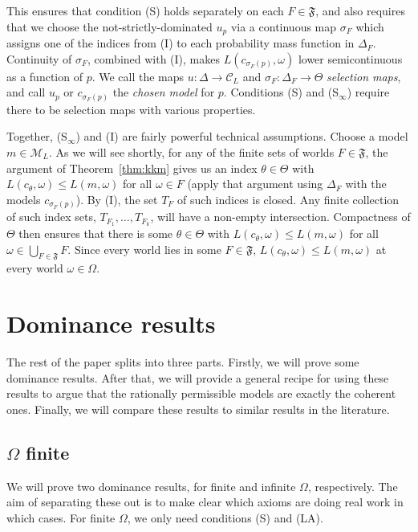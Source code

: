 \documentclass[11pt]{article}
\theoremstyle{definition}
\theoremstyle{remark}
\newcommand{\M}{\mathcal M}
\newcommand{\C}{\mathcal C}
\newcommand{\F}{\mathfrak F}
\begin{document}
This ensures that condition (S) holds separately on each $F\in\F$, and also requires that we choose the not-strictly-dominated $u_p$ via a continuous map $\sigma_F$ which assigns one of the indices from (I) to each probability mass function in $\Delta_F$. Continuity of $\sigma_F$, combined with (I), makes $L(c_{\sigma_F(p)},\omega)$ lower semicontinuous as a function of $p$. We call the maps $u:\Delta\to\C_L$ and $\sigma_F:\Delta_F\to\Theta$ \emph{selection maps}, and call $u_p$ or $c_{\sigma_F(p)}$ the \emph{chosen model} for $p$. Conditions (S) and (S$_\infty$) require there to be selection maps with various properties.

Together, (S$_\infty$) and (I) are fairly powerful technical assumptions. Choose a model $m\in\M_L$. As we will see shortly, for any of the finite sets of worlds $F\in\F$, the argument of Theorem~\ref{thm:kkm} gives us an index $\theta\in\Theta$ with $L(c_\theta,\omega)\le L(m,\omega)$ for all $\omega\in F$ (apply that argument using $\Delta_F$ with the models $c_{\sigma_F(p)}$). By (I), the set $T_F$ of such indices is closed. Any finite collection of such index sets, $T_{F_1},\dots, T_{F_k}$, will have a non-empty intersection. Compactness of $\Theta$ then ensures that there is some $\theta\in\Theta$ with $L(c_\theta,\omega)\le L(m,\omega)$ for all $\omega\in \bigcup_{F\in\F}F$. Since every world lies in some $F\in\F$, $L(c_\theta,\omega)\le L(m,\omega)$ at every world $\omega\in\Omega$.




\section{Dominance results}\label{sec:results}


The rest of the paper splits into three parts. Firstly, we will prove some dominance results. After that, we will provide a general recipe for using these results to argue that the rationally permissible models are exactly the coherent ones. Finally, we will compare these results to similar results in the literature.






\subsection{$\Omega$ finite}\label{sec:kkm}


We will prove two dominance results, for finite and infinite $\Omega$, respectively. The aim of separating these out is to make clear which axioms are doing real work in which cases. For finite $\Omega$, we only need conditions (S) and (LA).
\end{document}
